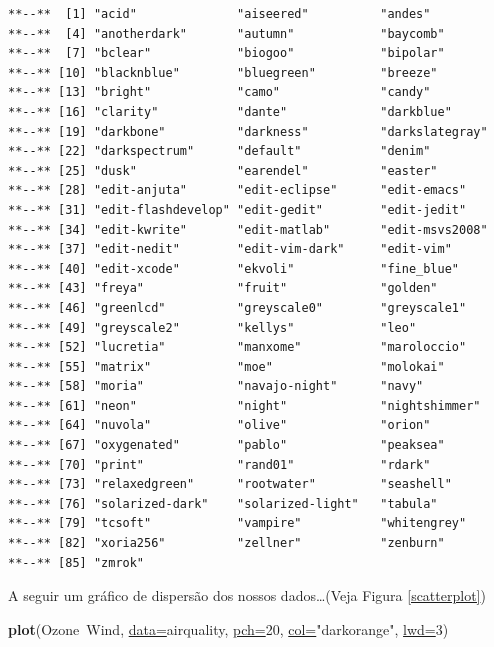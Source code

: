 \documentclass[12pt,brazil,]{article}
\newenvironment{Shaded}{\begin{snugshade}}{\end{snugshade}}
\newcommand{\DataTypeTok}[1]{\textcolor[rgb]{0.74,0.68,0.62}{\underline{#1}}}
\newcommand{\DecValTok}[1]{\textcolor[rgb]{0.27,0.67,0.26}{#1}}
\newcommand{\KeywordTok}[1]{\textcolor[rgb]{0.26,0.66,0.93}{\textbf{#1}}}
\newcommand{\NormalTok}[1]{\textcolor[rgb]{0.74,0.68,0.62}{#1}}
\newcommand{\OperatorTok}[1]{\textcolor[rgb]{0.74,0.68,0.62}{#1}}
\newcommand{\StringTok}[1]{\textcolor[rgb]{0.02,0.61,0.04}{#1}}
\begin{document}
\begin{verbatim}
**--**  [1] "acid"              "aiseered"          "andes"            
**--**  [4] "anotherdark"       "autumn"            "baycomb"          
**--**  [7] "bclear"            "biogoo"            "bipolar"          
**--** [10] "blacknblue"        "bluegreen"         "breeze"           
**--** [13] "bright"            "camo"              "candy"            
**--** [16] "clarity"           "dante"             "darkblue"         
**--** [19] "darkbone"          "darkness"          "darkslategray"    
**--** [22] "darkspectrum"      "default"           "denim"            
**--** [25] "dusk"              "earendel"          "easter"           
**--** [28] "edit-anjuta"       "edit-eclipse"      "edit-emacs"       
**--** [31] "edit-flashdevelop" "edit-gedit"        "edit-jedit"       
**--** [34] "edit-kwrite"       "edit-matlab"       "edit-msvs2008"    
**--** [37] "edit-nedit"        "edit-vim-dark"     "edit-vim"         
**--** [40] "edit-xcode"        "ekvoli"            "fine_blue"        
**--** [43] "freya"             "fruit"             "golden"           
**--** [46] "greenlcd"          "greyscale0"        "greyscale1"       
**--** [49] "greyscale2"        "kellys"            "leo"              
**--** [52] "lucretia"          "manxome"           "maroloccio"       
**--** [55] "matrix"            "moe"               "molokai"          
**--** [58] "moria"             "navajo-night"      "navy"             
**--** [61] "neon"              "night"             "nightshimmer"     
**--** [64] "nuvola"            "olive"             "orion"            
**--** [67] "oxygenated"        "pablo"             "peaksea"          
**--** [70] "print"             "rand01"            "rdark"            
**--** [73] "relaxedgreen"      "rootwater"         "seashell"         
**--** [76] "solarized-dark"    "solarized-light"   "tabula"           
**--** [79] "tcsoft"            "vampire"           "whitengrey"       
**--** [82] "xoria256"          "zellner"           "zenburn"          
**--** [85] "zmrok"
\end{verbatim}

A seguir um gráfico de dispersão dos nossos dados\ldots{}(Veja Figura
\ref{scatterplot})

\begin{Shaded}
\begin{Highlighting}[]
\KeywordTok{plot}\NormalTok{(Ozone}\OperatorTok{~}\NormalTok{Wind, }\DataTypeTok{data=}\NormalTok{airquality, }\DataTypeTok{pch=}\DecValTok{20}\NormalTok{, }
     \DataTypeTok{col=}\StringTok{"darkorange"}\NormalTok{, }\DataTypeTok{lwd=}\DecValTok{3}\NormalTok{)}
\end{Highlighting}
\end{Shaded}
\end{document}

